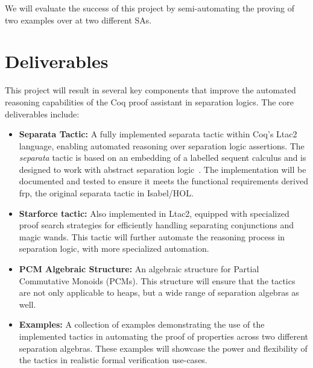 \documentclass[12pt,lettersize]{article}
\begin{document}
We will evaluate the success of this project by semi-automating the proving of two examples over at two different SAs.

\section{Deliverables}
This project will result in several key components that improve the automated reasoning capabilities of the Coq proof assistant in 
separation logics. The core deliverables include:

\begin{itemize}
\item \textbf{Separata Tactic:} A fully implemented separata tactic within Coq's Ltac2 language, enabling automated
reasoning over separation logic assertions. The \emph{separata} tactic is based on an embedding of a labelled sequent calculus
and is designed to work with abstract separation logic~\cite{hou2017proof}. The implementation will be documented and tested to ensure
it meets the functional requirements derived frp, the original separata tactic in Isabel/HOL.

\item \textbf{Starforce tactic:} Also implemented in Ltac2, equipped with specialized proof search strategies for efficiently handling
separating conjunctions and magic wands. This tactic will further automate the reasoning process in separation logic, with more specialized
automation.

\item \textbf{PCM Algebraic Structure:} An algebraic structure for Partial Commutative Monoids (PCMs).
This structure will ensure that the tactics are not only applicable to heaps, but a wide range of separation algebras as well.

\item \textbf{Examples:} A collection of examples demonstrating the use of the implemented tactics in automating the proof of properties
across two different separation algebras. These examples will showcase the power and flexibility of the tactics in realistic 
formal verification use-cases.
\end{itemize}



\end{document}
